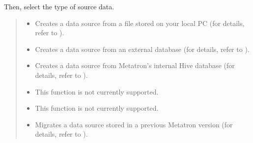 \documentclass[letterpaper,10pt,english]{sphinxmanual}
\begin{document}
Then, select the type of source data.
\begin{quote}

\begin{figure}[H]
\centering

\noindent{}
\end{figure}
\begin{itemize}
\item {} 
 Creates a data source from a file stored on your local PC (for details, refer to {\hyperref[\detokenize{discovery/part02/create_a_data_source:create-datasource-from-file}]{}}).

\item {} 
 Creates a data source from an external database (for details, refer to {\hyperref[\detokenize{discovery/part02/create_a_data_source:create-datasource-from-db}]{}}).

\item {} 
 Creates a data source from Metatron’s internal Hive database (for details, refer to {\hyperref[\detokenize{discovery/part02/create_a_data_source:create-datasource-from-stagingdb}]{}}).

\item {} 
 This function is not currently supported.

\item {} 
 This function is not currently supported.

\item {} 
 Migrates a data source stored in a previous Metatron version (for details, refer to {\hyperref[\detokenize{discovery/part02/create_a_data_source:create-datasource-from-metatron}]{}}).

\end{itemize}
\end{quote}
\end{document}
